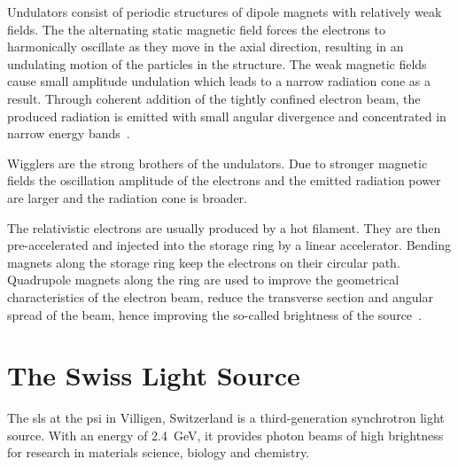 Undulators consist of periodic structures of dipole magnets with relatively weak fields. The the alternating static magnetic field forces the electrons to harmonically oscillate as they move in the axial direction, resulting in an undulating motion of the particles in the structure. The weak magnetic fields cause small amplitude undulation which leads to a narrow radiation cone as a result. Through coherent addition of the tightly confined electron beam, the produced radiation is emitted with small angular divergence and concentrated in narrow energy bands~\cite{Stampanoni2002a}.

Wigglers are the strong brothers of the undulators. Due to stronger magnetic fields the oscillation amplitude of the electrons and the emitted radiation power are larger and the radiation cone is broader.

The relativistic electrons are usually produced by a hot filament. They are then pre-accelerated and injected into the storage ring by a linear accelerator. Bending magnets along the storage ring keep the electrons on their circular path. Quadrupole magnets along the ring are used to improve the geometrical characteristics of the electron beam, \ie reduce the transverse section and angular spread of the beam, hence improving the so-called brightness of the source~\cite{Margaritondo2002}.

\section{The Swiss Light Source}
The \ac{sls} at the \ac{psi} in Villigen, Switzerland is a third-generation synchrotron light source. With an energy of \SI{2.4}{\giga\electronvolt}, it provides photon beams of high brightness for research in materials science, biology and chemistry.

